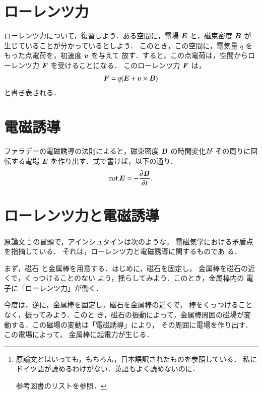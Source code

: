     \section{ローレンツ力}
        ローレンツ力について，復習しよう．ある空間に，電場 $\boldsymbol{E}$ と，磁束密度 $\boldsymbol{B}$ が
        生じていることが分かっているとしよう．
        このとき，この空間に，電気量 $q$ をもった点電荷を，初速度 $\boldsymbol{v}$ を与えて
        放す．すると，この点電荷は，空間からローレンツ力 $\boldsymbol{F}$ を受けることになる．
        このローレンツ力 $\boldsymbol{F}$ は，
            \begin{align}
                \boldsymbol{F} = q(\boldsymbol{E} + \boldsymbol{v} \times \boldsymbol{B})
            \end{align}
        と書き表される．

    \section{電磁誘導}
        ファラデーの電磁誘導の法則によると，磁束密度 $\boldsymbol{B}$ の時間変化が
        その周りに回転する電場 $\boldsymbol{E}$ を作り出す．式で書けば，以下の通り．
            \begin{align}
                \mathrm{rot}\, \boldsymbol{E} = - \frac{\partial \boldsymbol{B}}{\partial t}.
            \end{align}


    \section{ローレンツ力と電磁誘導}
    原論文
        \footnote{
            原論文とはいっても，もちろん，日本語訳されたものを参照している．
            私にドイツ語が読めるわけがない．英語もよく読めないのに．

            参考図書のリスト\cite{bib:refbook_rel_1}を参照．
        }
    の冒頭で，アインシュタインは次のような，
    電磁気学における矛盾点を指摘している．
    それは，ローレンツ力と電磁誘導に関するものであ
    る．

    まず，磁石
    と金属棒を用意する．はじめに，磁石を固定し，
    金属棒を磁石の近くで，くっつけることのない
    よう，揺らしてみよう．このとき，金属棒内の
    電子に「ローレンツ力」が働く．

    今度は，逆に，金属棒を固定し，磁石を金属棒の近くで，
    棒をくっつけることなく，振ってみよう．このと
    き，磁石の振動によって，金属棒周囲の磁場が変
    動する．この磁場の変動は「電磁誘導」により，
    その周囲に電場を作り出す．この電場によって，
    金属棒に起電力が生じる．

